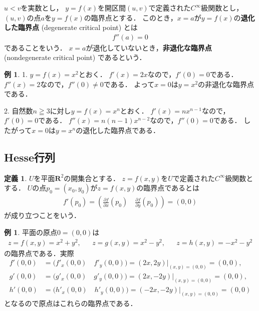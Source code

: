 \documentclass[11pt, a4paper, dvipdfmx]{jsarticle}
\theoremstyle{definition}
\newtheorem{Example}[Axiom]{例}
\newcommand{\rr}{\mathbf{R}}
\newcommand{\p}{\partial}
\theoremstyle{mystyle}
\newtheorem{DFN}[Axiom]{定義}
\newtheorem{EG}[Axiom]{例}
\numberwithin{equation}{section} %
\begin{document}
$u<v$を実数とし，
$y=f(x)$を開区間$(u,v)$で定義された$C^{\infty}$級関数とし，
$(u,v)$の点$a$を$y=f(x)$の臨界点とする．
このとき，$x=a$が$y=f(x)$の\textbf{退化した臨界点} (degenerate critical point) とは
\begin{align}
    f''(a)=0
\end{align}
であることをいう．
$x=a$が退化していないとき，\textbf{非退化な臨界点} (nondegenerate critical point) であるという．


\begin{Example}
    1.
    $y=f(x)=x^2$とおく．
    $f'(x)=2x$なので，$f'(0)=0$である．
    $f''(x)=2$なので，$f''(0)\neq0$である．
    よって$x=0$は$y=x^2$の非退化な臨界点である．

    2.
    自然数$n\geqq 3$に対し$y=f(x)=x^n$とおく．
    $f'(x)=nx^{n-1}$なので，$f'(0)=0$である．
    $f''(x)=n(n-1)x^{n-2}$なので，$f''(0)=0$である．
    したがって$x=0$は$y=x^n$の退化した臨界点である．
\end{Example}


\subsection{Hesse行列}

\begin{DFN}
    $U$を平面$\rr^2$の開集合とする．
    $z=f(x,y)$を$U$で定義された$C^{\infty}$級関数とする．
    $U$の点$p_0=(x_0,y_0)$が$z=f(x,y)$の臨界点であるとは
    \begin{align}
        f'(p_0)=\left(\frac{\p f}{\p x}(p_0)\quad \frac{\p f}{\p y}(p_0)\right)=(0,0) \label{eq:crit2}
    \end{align}
    が成り立つことをいう．
\end{DFN}

\begin{EG}
    平面の原点$0=(0,0)$は
    \begin{align}
        z=f(x,y)=x^2+y^2,&& z=g(x,y)=x^2-y^2,&& z=h(x,y)=-x^2-y^2 \label{eq:quadFunc}
    \end{align}
    の臨界点である．実際
    \begin{align*}
        f'(0,0) &= \Big(f'_x(0,0)\quad f'_y(0,0)\Big)=(2x,2y)|_{(x,y)=(0,0)}=(0,0),  \\
        g'(0,0) &= \Big(g'_x(0,0)\quad g'_y(0,0)\Big)=(2x,-2y)|_{(x,y)=(0,0)}=(0,0),  \\
        h'(0,0) &= \Big(h'_x(0,0)\quad h'_y(0,0)\Big)=(-2x,-2y)|_{(x,y)=(0,0)}=(0,0)
    \end{align*}
    となるので原点はこれらの臨界点である．
\end{EG}
\end{document}
